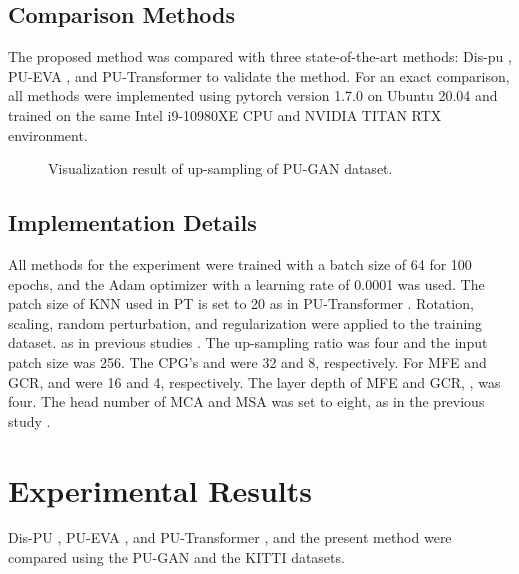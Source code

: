 \documentclass{article}
\begin{document}
\subsection{Comparison Methods}
\quad The proposed method was compared with three state-of-the-art methods: Dis-pu \cite{li2021point}, PU-EVA \cite{luo2021pu}, and PU-Transformer \cite{qiu2021pu} to validate the method. For an exact comparison, all methods were implemented using pytorch \cite{NEURIPS2019_9015} version 1.7.0 on Ubuntu 20.04 and trained on the same Intel i9-10980XE CPU and NVIDIA TITAN RTX environment.

\begin{figure}[htb!]
  \centering
  \caption{Visualization result of  up-sampling of PU-GAN dataset.}
    \label{fig:x16}
\end{figure}

\subsection{Implementation Details}
\label{sec:implementation}
\quad All methods for the experiment were trained with a batch size of 64 for 100 epochs, and the Adam \cite{kingma2014adam}  optimizer with a learning rate of 0.0001 was used. The patch size of KNN used in PT is set to 20 as in PU-Transformer \cite{qiu2021pu}. Rotation, scaling, random perturbation, and regularization were applied to the training dataset. as in previous studies \cite{yu2018pu,li2019pu}. The up-sampling ratio  was four and the input patch size  was 256. The CPG's  and  were 32 and 8, respectively. For MFE and GCR,  and  were 16 and 4, respectively. The layer depth of MFE and GCR, , was four. The head number of MCA and MSA was set to eight, as in the previous study \cite{vaswani2017attention}.

\section{Experimental Results}
\label{sec:experiment_results}
\quad Dis-PU \cite{li2021point}, PU-EVA \cite{luo2021pu}, and PU-Transformer \cite{qiu2021pu}, and the present method were compared using the PU-GAN \cite{li2019pu} and the KITTI \cite{geiger2013vision} datasets.
\end{document}

